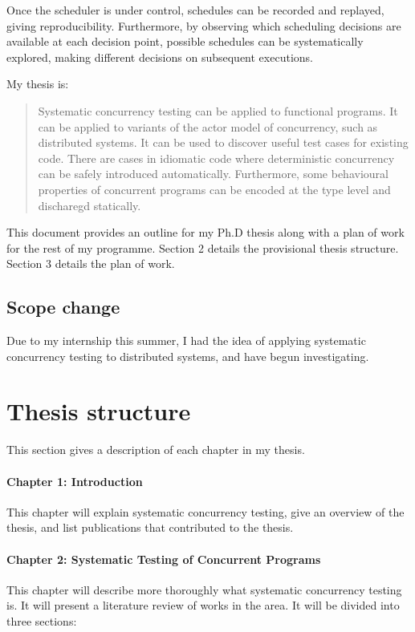 \documentclass{article}
\begin{document}
Once the scheduler is under control, schedules can be recorded and
replayed, giving reproducibility. Furthermore, by observing which
scheduling decisions are available at each decision point, possible
schedules can be systematically explored, making different decisions
on subsequent executions.

My thesis is:

\begin{quote}
  Systematic concurrency testing can be applied to functional
  programs. It can be applied to variants of the actor model of
  concurrency, such as distributed systems. It can be used to discover
  useful test cases for existing code. There are cases in idiomatic
  code where deterministic concurrency can be safely introduced
  automatically. Furthermore, some behavioural properties of
  concurrent programs can be encoded at the type level and discharegd
  statically.
\end{quote}

This document provides an outline for my Ph.D thesis along with a plan
of work for the rest of my programme. Section 2 details the
provisional thesis structure. Section 3 details the plan of work.

\subsection{Scope change}

Due to my internship this summer, I had the idea of applying
systematic concurrency testing to distributed systems, and have begun
investigating.

\section{Thesis structure}

This section gives a description of each chapter in my thesis.

\paragraph{Chapter 1: Introduction} This chapter will explain
systematic concurrency testing, give an overview of the thesis, and
list publications that contributed to the thesis.

\paragraph{Chapter 2: Systematic Testing of Concurrent Programs} This
chapter will describe more thoroughly what systematic concurrency
testing is. It will present a literature review of works in the
area. It will be divided into three sections:
\end{document}
